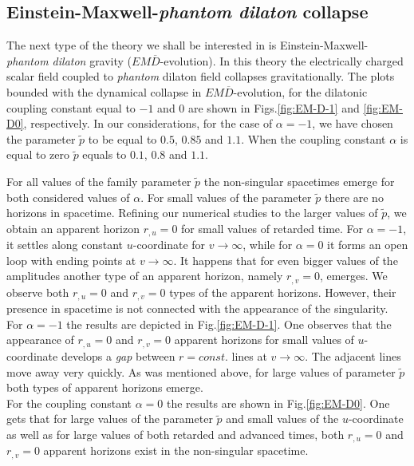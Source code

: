 \documentclass[aps,showpacs,nofootinbib,floatfix]{revtex4}
\newcommand{\tpe}{{\tilde p}}
\begin{document}
\subsection{Einstein-Maxwell-{\it phantom dilaton} collapse}
The next type of the theory we shall be interested in is Einstein-Maxwell-{\it phantom dilaton} gravity
($EM\overline{D}$-evolution). In this theory the electrically charged scalar field coupled to {\it phantom} 
dilaton field collapses gravitationally. The plots bounded with the dynamical collapse in 
$EM\overline{D}$-evolution, for the dilatonic coupling constant equal to 
$-1$ and $0$ are shown in Figs.\ref{fig:EM-D-1} and \ref{fig:EM-D0}, respectively.
In our considerations, for the case of $\alpha = -1$, we have chosen the parameter $\tpe$ to be equal to 
$0.5$, $0.85$ and $1.1$. When the coupling constant $\alpha$ is equal to zero 
$\tpe$ equals to $0.1$, $0.8$ and $1.1$.
\par
For all values of the family parameter $\tpe$ the non-singular spacetimes emerge for both considered values of 
$\alpha$. For small values of the parameter $\tpe$ there are no horizons in spacetime. 
Refining our numerical studies to the larger values of $\tpe$, we obtain an apparent horizon
$r_{,u}=0$ for small values of retarded time. For $\alpha=-1$, it settles along constant $u$-coordinate 
for $v\rightarrow\infty$, while for $\alpha=0$ it forms an open loop with ending points at $v\to\infty$. It 
happens that for even bigger values of the amplitudes another type of an apparent horizon, 
namely $r_{,v}=0$, emerges. We observe both $r_{,u}=0$ and $r_{,v}=0$ types of the apparent horizons. 
However, their presence in spacetime is not connected with the appearance of the singularity.\\
For $\alpha=-1$ the results are depicted in Fig.\ref{fig:EM-D-1}.
One observes that the appearance of $r_{,u}=0$ and $r_{,v}=0$ apparent horizons for small values of $u$-coordinate
develops a {\it gap} between $r=const.$ lines at $v\rightarrow\infty$. The adjacent lines move away very quickly. 
As was mentioned above, for large values of parameter $\tpe$ both types of apparent horizons emerge.\\
For the coupling constant $\alpha=0$ the results are shown in Fig.\ref{fig:EM-D0}.
One gets that for large values of the parameter $\tpe$ and small values of the $u$-coordinate as well as 
for large values of both retarded and advanced times, both $r_{,u}=0$ and $r_{,v}=0$ apparent horizons 
exist in the non-singular spacetime.
\par
\end{document}
